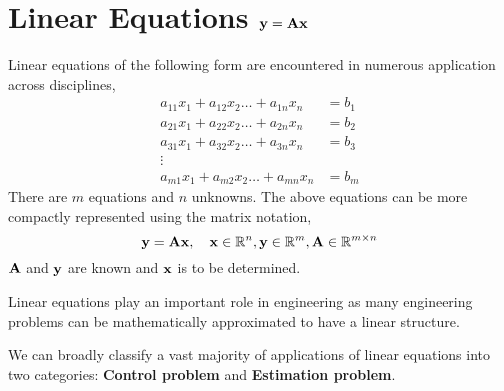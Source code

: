 \section{Linear Equations $\mathbf{y} = \mathbf{A}\mathbf{x}$}
Linear equations of the following form are encountered in numerous application across disciplines,
\[ \begin{split}
a_{11}x_1 + a_{12}x_2 \ldots + a_{1n}x_n & = b_1 \\
a_{21}x_1 + a_{22}x_2 \ldots + a_{2n}x_n & = b_2 \\
a_{31}x_1 + a_{32}x_2 \ldots + a_{3n}x_n & = b_3 \\
\vdots \\
a_{m1}x_1 + a_{m2}x_2 \ldots + a_{mn}x_n & = b_m
\end{split} \]
There are $m$ equations and $n$ unknowns. The above equations can be more compactly represented using the matrix notation,
\[ \mathbf{y} = \mathbf{A}\mathbf{x}, \quad \mathbf{x} \in \mathbb{R}^n, \mathbf{y} \in \mathbb{R}^m, \mathbf{A} \in \mathbb{R}^{m \times n} \]
$\mathbf{A}$ and $\mathbf{y}$ are known and $\mathbf{x}$ is to be determined.

Linear equations play an important role in engineering as many engineering problems can be mathematically approximated to have a linear structure.

We can broadly classify a vast majority of applications of linear equations into two categories: \textbf{Control problem} and \textbf{Estimation problem}.

